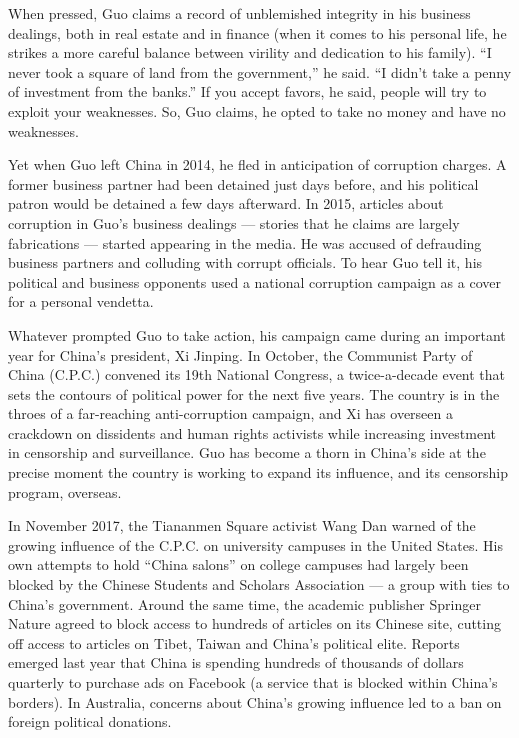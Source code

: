 When pressed, Guo claims a record of unblemished integrity in his
business dealings, both in real estate and in finance (when it comes to
his personal life, he strikes a more careful balance between virility
and dedication to his family). ``I never took a square of land from the
government,'' he said. ``I didn't take a penny of investment from the
banks.'' If you accept favors, he said, people will try to exploit your
weaknesses. So, Guo claims, he opted to take no money and have no
weaknesses.

Yet when Guo left China in 2014, he fled in anticipation of corruption
charges. A former business partner had been detained just days before,
and his political patron would be detained a few days afterward. In
2015, articles about corruption in Guo's business dealings --- stories
that he claims are largely fabrications --- started appearing in the
media. He was accused of defrauding business partners and colluding with
corrupt officials. To hear Guo tell it, his political and business
opponents used a national corruption campaign as a cover for a personal
vendetta.

Whatever prompted Guo to take action, his campaign came during an
important year for China's president, Xi Jinping. In October, the
Communist Party of China (C.P.C.) convened its 19th National Congress, a
twice-a-decade event that sets the contours of political power for the
next five years. The country is in the throes of a far-reaching
anti-corruption campaign, and Xi has overseen a crackdown on dissidents
and human rights activists while increasing investment in censorship and
surveillance. Guo has become a thorn in China's side at the precise
moment the country is working to expand its influence, and its
censorship program, overseas.

In November 2017, the Tiananmen Square activist Wang Dan warned of the
growing influence of the C.P.C. on university campuses in the United
States. His own attempts to hold ``China salons'' on college campuses
had largely been blocked by the Chinese Students and Scholars
Association --- a group with ties to China's government. Around the same
time, the academic publisher Springer Nature agreed to block access to
hundreds of articles on its Chinese site, cutting off access to articles
on Tibet, Taiwan and China's political elite. Reports emerged last year
that China is spending hundreds of thousands of dollars quarterly to
purchase ads on Facebook (a service that is blocked within China's
borders). In Australia, concerns about China's growing influence led to
a ban on foreign political donations.

